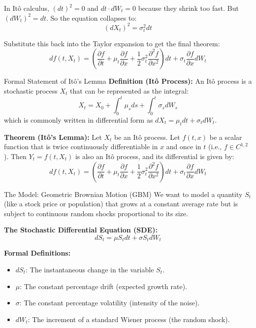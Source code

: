\documentclass{beamer}
\begin{document}
\begin{frame}
In It\^o calculus, $(dt)^2 = 0$ and $dt \cdot dW_t = 0$ because they shrink too fast. But $(dW_t)^2 = dt$. So the equation collapses to:
\[ (dX_t)^2 = \sigma_t^2 dt \]

Substitute this back into the Taylor expansion to get the final theorem:
\[ df(t, X_t) = \left( \frac{\partial f}{\partial t} + \mu_t \frac{\partial f}{\partial x} + \frac{1}{2}\sigma_t^2 \frac{\partial^2 f}{\partial x^2} \right) dt + \sigma_t \frac{\partial f}{\partial x} dW_t \]
\end{frame}

\begin{frame}{Formal Statement of It\^o's Lemma}
\textbf{Definition (It\^o Process):}
An It\^o process is a stochastic process $X_t$ that can be represented as the integral:
\[ X_t = X_0 + \int_0^t \mu_s ds + \int_0^t \sigma_s dW_s \]
which is commonly written in differential form as $dX_t = \mu_t dt + \sigma_t dW_t$.
\medskip

\textbf{Theorem (It\^o's Lemma):} 
Let $X_t$ be an It\^o process. Let $f(t, x)$ be a scalar function that is twice continuously differentiable in $x$ and once in $t$ (i.e., $f \in C^{1,2}$). Then $Y_t = f(t, X_t)$ is also an It\^o process, and its differential is given by:
\[
df(t, X_t) = \left( \frac{\partial f}{\partial t} + \mu_t \frac{\partial f}{\partial x} + \frac{1}{2}\sigma_t^2 \frac{\partial^2 f}{\partial x^2} \right) dt + \sigma_t \frac{\partial f}{\partial x} dW_t
\]
\medskip
\end{frame}
\begin{frame}{The Model: Geometric Brownian Motion (GBM)}
We want to model a quantity $S_t$ (like a stock price or population) that grows at a constant average rate but is subject to continuous random shocks proportional to its size.

\vspace{0.5cm}
\textbf{The Stochastic Differential Equation (SDE):}
\[ dS_t = \mu S_t dt + \sigma S_t dW_t \]

\textbf{Formal Definitions:}
\begin{itemize}
    \item $dS_t$: The instantaneous change in the variable $S_t$.
    \item $\mu$: The constant percentage drift (expected growth rate).
    \item $\sigma$: The constant percentage volatility (intensity of the noise).
    \item $dW_t$: The increment of a standard Wiener process (the random shock).
\end{itemize}
\end{frame}
\end{document}
